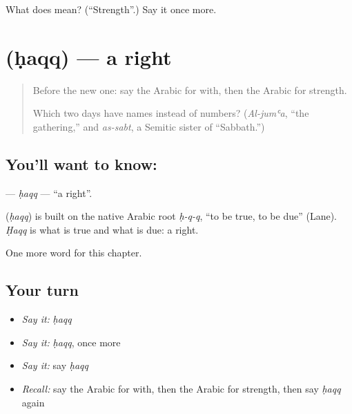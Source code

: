 \begin{tcolorbox}[breakable,colback=teal!4,colframe=teal!35!black,title={Before you move on}]
What does  mean? (\textquotedblleft{}Strength\textquotedblright{}.) Say it once more.
\end{tcolorbox}
\section[\texorpdfstring{\ar{حق} (ḥaqq)}{حق (ḥaqq)}]{ (ḥaqq) — a right}

\label{lesson:AR-C108-haqq}



\begin{quote}
Before the new one: say the Arabic for with, then the Arabic for strength.

Which two days have names instead of numbers? (\emph{Al-jumʿa}, \textquotedblleft{}the gathering,\textquotedblright{} and \emph{as-sabt}, a Semitic sister of \textquotedblleft{}Sabbath.\textquotedblright{})
\end{quote}

\subsection*{You'll want to know: }
\textbf{} — \emph{ḥaqq} — \textquotedblleft{}a right\textquotedblright{}.

\begin{cousinweb}
\textbf{} (\emph{ḥaqq}) is built on the native Arabic root \emph{ḥ-q-q}, \textquotedblleft{}to be true, to be due\textquotedblright{} (Lane). \emph{Ḥaqq} is what is true and what is due: a right.
\end{cousinweb}

\begin{grammarlens}[title={What you've built}]
One more word for this chapter.
\end{grammarlens}

\subsection*{Your turn}
\begin{itemize}
\raggedright
  \item \emph{Say it:} \emph{ḥaqq}
  \item \emph{Say it:} \emph{ḥaqq}, once more
  \item \emph{Say it:} say \emph{ḥaqq}
  \item \emph{Recall:} say the Arabic for with, then the Arabic for strength, then say \emph{ḥaqq} again
\end{itemize}

